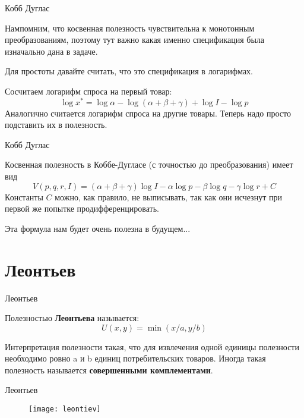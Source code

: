 \documentclass{beamer}
\begin{document}
\begin{frame}{Кобб Дуглас}

Нампомним, что косвенная полезность чувствительна к монотонным преобразованиям, поэтому тут важно какая именно спецификация была изначально дана в задаче. 

Для простоты давайте считать, что это спецификация в логарифмах.

Сосчитаем логарифм спроса на первый товар:
$$\log x^{\ast} = \log \alpha - \log (\alpha + \beta + \gamma) + \log I - \log p$$
Аналогично считается логарифм спроса на другие товары. Теперь надо просто подставить их в полезность.

\end{frame}

\begin{frame}{Кобб Дуглас}

Косвенная полезность в Коббе-Дугласе (с точностью до преобразования) имеет вид
$$V(p,q,r,I) = (\alpha + \beta + \gamma) \log I - \alpha \log p - \beta \log q - \gamma \log r + C $$
Константы $C$ можно, как правило, не выписывать, так как они исчезнут при первой же попытке продифференцировать.

Эта формула нам будет очень полезна в будущем...
\end{frame}

\section{Леонтьев}

\begin{frame}{Леонтьев}

\begin{definition}
Полезностью \textbf{Леонтьева} называется:
$$U(x, y) = \min(x/a, y/b)$$  
\end{definition}

Интерпретация полезности такая, что для извлечения одной единицы полезности необходимо ровно a и b единиц потребительских товаров. Иногда такая полезность называется \textbf{совершенными комплементами}.

\end{frame}

\begin{frame}{Леонтьев}

\begin{figure}[hbt]
\centering
\texttt{[image: leontiev]}
\end{figure}

\end{frame}
\end{document}

